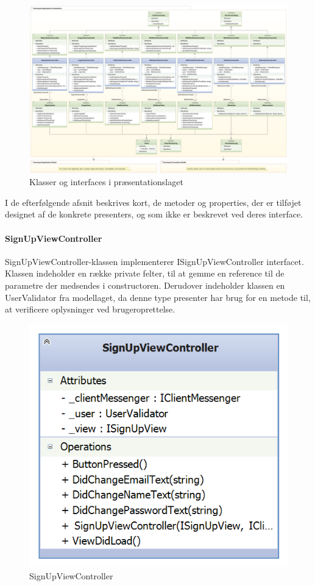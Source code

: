 \begin{landscape}
\begin{figure}
	\centering
	\includegraphics[width=1\linewidth]{figs/design/application_presentation_full}
	\caption{Klasser og interfaces i præsentationslaget}
	\label{fig:application_presentation_full}
\end{figure}
\end{landscape}

I de efterfølgende afsnit beskrives kort, de metoder og properties, der er tilføjet designet af de konkrete presenters, og som ikke er beskrevet ved deres interface.

\paragraph{SignUpViewController}
SignUpViewController-klassen implementerer ISignUpViewController interfacet. Klassen indeholder en række private felter, til at gemme en reference til de parametre der medsendes i constructoren. Derudover indeholder klassen en UserValidator fra modellaget, da denne type presenter har brug for en metode til, at verificere oplysninger ved brugeroprettelse.

\begin{figure}
	\centering
	\includegraphics[width=0.3\linewidth]{figs/design/application_signupviewcontroller}
	\caption{SignUpViewController}
	\label{fig:application_signupviewcontroller}
\end{figure}

